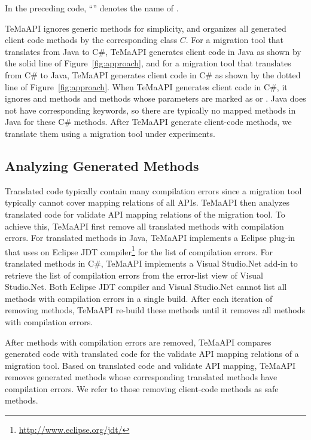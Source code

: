 In the preceding code, ``'' denotes the name of .

TeMaAPI ignores generic methods for simplicity, and organizes all generated client code methods by the corresponding class $C$. For a migration tool that translates from Java to C\#, TeMaAPI generates client code in Java as shown by the solid line of Figure~\ref{fig:approach}, and for a migration tool that translates from C\# to Java, TeMaAPI generates client code in C\# as shown by the dotted line of Figure~\ref{fig:approach}. When TeMaAPI generates client code in C\#, it ignores  and  methods and methods whose parameters are marked as  or . Java does not have corresponding keywords, so there are typically no mapped methods in Java for these C\# methods. After TeMaAPI generate client-code methods, we translate them using a migration tool under experiments.


\subsection{Analyzing Generated Methods}
\label{sec:approach:analyzing}
Translated code typically contain many compilation errors since a migration tool typically cannot cover mapping relations of all APIs. TeMaAPI then analyzes translated code for validate API mapping relations of the migration tool. To achieve this, TeMaAPI first remove all translated methods with compilation errors. For translated methods in Java, TeMaAPI implements a Eclipse plug-in that uses on Eclipse JDT compiler\footnote{\url{http://www.eclipse.org/jdt/}} for the list of compilation errors. For translated methods in C\#, TeMaAPI implements a Visual Studio.Net add-in to retrieve the list of compilation errors from the error-list view of Visual Studio.Net. Both Eclipse JDT compiler and Visual Studio.Net cannot list all methods with compilation errors in a single build. After each iteration of removing methods, TeMaAPI re-build these methods until it removes all methods with compilation errors.

After methods with compilation errors are removed, TeMaAPI compares generated code with translated code for the validate API mapping relations of a migration tool. Based on translated code and validate API mapping, TeMaAPI removes generated methods whose corresponding translated methods have compilation errors. We refer to those removing client-code methods as safe methods.

